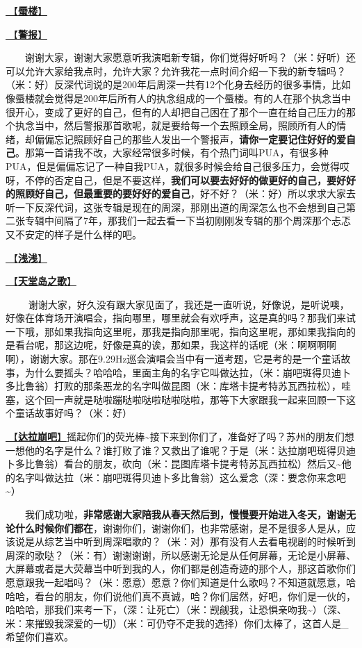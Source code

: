 \documentclass[]{ctexbook}
\begin{document}
\hyperref[mirage]{🎵【\textbf{蜃楼}】}

\hyperref[the-giver]{🎵【\textbf{警报}】}

  谢谢大家，谢谢大家愿意听我演唱新专辑，你们觉得好听吗？（米：好听）还可以允许大家给我点时，允许大家？允许我花一点时间介绍一下我的新专辑吗？（米：好）反深代词说的是200年后周深一共有12个化身去经历的很多事情，比如像蜃楼就会觉得是200年后所有人的执念组成的一个蜃楼。有的人在那个执念当中很开心，变成了更好的自己，但有的人却把自己困在了那个一直在给自己压力的那个执念当中，然后警报那首歌呢，就是要给每一个去照顾全局，照顾所有人的情绪，却偏偏忘记照顾好自己的那些人发出一个警报声，\textbf{请你一定要记住好好的爱自己}。那第一首请我不改，大家经常很多时候，有个热门词叫PUA，有很多种PUA，但是偏偏忘记了一种自我PUA，就很多时候会给自己很多压力，会觉得哎呀，不停的否定自己，但是不要这样，\textbf{我们可以要去好好的做更好的自己，要好好的照顾好自己，但最重要的要好好的爱自己}，好不好？（米：好）所以求求大家去听一下反深代词，这张专辑是现在的周深，那刚出道的周深怎么也不会想到自己第二张专辑中间隔了7年，那我们一起去看一下当初刚刚发专辑的那个周深那个忐忑又不安定的样子是什么样的吧。

\hyperref[qianqian]{🎵【\textbf{浅浅}】}

\hyperref[haven-song]{🎵【\textbf{天堂岛之歌}】}

   谢谢大家，好久没有跟大家见面了，我还是一直听说，好像说，是听说噢，好像在体育场开演唱会，指向哪里，哪里就会有欢呼声，这是真的吗？那我们来试一下哦，那如果我指向这里呢，那我是指向那里呢，指向这里呢，那如果我指向的是看台呢，那这边呢，好像是真的诶，那如果，我这样的话呢（米：啊啊啊啊啊），谢谢大家。那在9.29Hz巡会演唱会当中有一道考题，它是考的是一个童话故事，为什么要摇头？哈哈哈，里面主角的名字它叫做达拉，（米：崩吧斑得贝迪卜多比鲁翁）打败的那条恶龙的名字叫做昆图（米：库塔卡提考特苏瓦西拉松），哇塞，这个回一声就是哒啦蹦哒啦哒啦哒啦哒啦，那等下大家跟我一起来回顾一下这个童话故事好吗？（米：好）

\hyperref[dalabengba]{🎵【\textbf{达拉崩吧}】}摇起你们的荧光棒\textasciitilde 接下来到你们了，准备好了吗？苏州的朋友们想一想他的名字是什么？谁打败了谁？又救出了谁呢？于是（米：达拉崩吧斑得贝迪卜多比鲁翁）看台的朋友，砍向（米：昆图库塔卡提考特苏瓦西拉松）然后又\textasciitilde 他的名字叫做达拉（米：崩吧斑得贝迪卜多比鲁翁）这么爱念（深：要念你来念吧\textasciitilde）

  我们成功啦，\textbf{非常感谢大家陪我从春天然后到，慢慢要开始进入冬天，谢谢无论什么时候你们都在}，谢谢你们，谢谢你们，也非常感谢，是不是很多人是从，应该说是从综艺当中听到周深唱歌的？（米：对）那有没有人去看电视剧的时候听到周深的歌哒？（米：有）谢谢谢谢，所以感谢无论是从任何屏幕，无论是小屏幕、大屏幕或者是大荧幕当中听到我的人，你们都是创造奇迹的那个人，那这首歌你们愿意跟我一起唱吗？（米：愿意）愿意？你们知道是什么歌吗？不知道就愿意，哈哈哈，看台的朋友，你们说他们真不真诚，哈？你们居然，好吧，你们是一伙的，哈哈哈，那我们来考一下，（深：让死亡）（米：觊觎我，让恐惧亲吻我\textasciitilde）（深、米：来摧毁我深爱的一切）（米：可仍夺不走我的选择）你们太棒了，这首人是\_希望你们喜欢。
\end{document}
